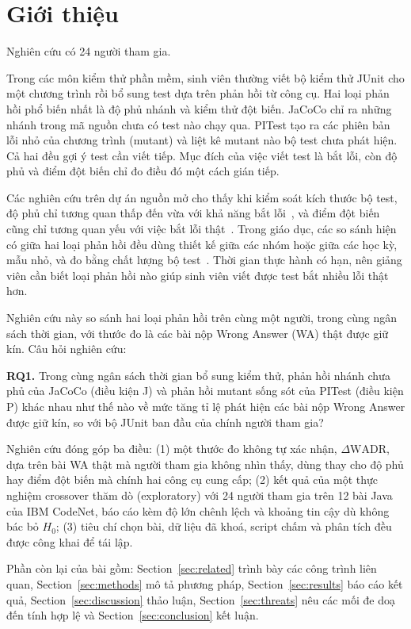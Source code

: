 \section{Giới thiệu}
\label{sec:intro}

Nghiên cứu có 24 người tham gia.

Trong các môn kiểm thử phần mềm, sinh viên thường viết bộ kiểm thử JUnit cho một chương trình rồi bổ sung test dựa trên phản hồi từ công cụ. Hai loại phản hồi phổ biến nhất là độ phủ nhánh và kiểm thử đột biến. JaCoCo chỉ ra những nhánh trong mã nguồn chưa có test nào chạy qua. PITest tạo ra các phiên bản lỗi nhỏ của chương trình (mutant) và liệt kê mutant nào bộ test chưa phát hiện. Cả hai đều gợi ý test cần viết tiếp. Mục đích của việc viết test là bắt lỗi, còn độ phủ và điểm đột biến chỉ đo điều đó một cách gián tiếp.

Các nghiên cứu trên dự án nguồn mở cho thấy khi kiểm soát kích thước bộ test, độ phủ chỉ tương quan thấp đến vừa với khả năng bắt lỗi~\cite{inozemtseva2014}, và điểm đột biến cũng chỉ tương quan yếu với việc bắt lỗi thật~\cite{papadakis2018}. Trong giáo dục, các so sánh hiện có giữa hai loại phản hồi đều dùng thiết kế giữa các nhóm hoặc giữa các học kỳ, mẫu nhỏ, và đo bằng chất lượng bộ test~\cite{mansur2024,alonge2025}. Thời gian thực hành có hạn, nên giảng viên cần biết loại phản hồi nào giúp sinh viên viết được test bắt nhiều lỗi thật hơn.

Nghiên cứu này so sánh hai loại phản hồi trên cùng một người, trong cùng ngân sách thời gian, với thước đo là các bài nộp Wrong Answer (WA) thật được giữ kín. Câu hỏi nghiên cứu:

\textbf{RQ1.} Trong cùng ngân sách thời gian bổ sung kiểm thử, phản hồi nhánh chưa phủ của JaCoCo (điều kiện J) và phản hồi mutant sống sót của PITest (điều kiện P) khác nhau như thế nào về mức tăng tỉ lệ phát hiện các bài nộp Wrong Answer được giữ kín, so với bộ JUnit ban đầu của chính người tham gia?

Nghiên cứu đóng góp ba điều: (1) một thước đo không tự xác nhận, $\Delta\mathrm{WADR}$, dựa trên bài WA thật mà người tham gia không nhìn thấy, dùng thay cho độ phủ hay điểm đột biến mà chính hai công cụ cung cấp; (2) kết quả của một thực nghiệm crossover thăm dò (exploratory) với 24 người tham gia trên 12 bài Java của IBM CodeNet, báo cáo kèm độ lớn chênh lệch và khoảng tin cậy dù không bác bỏ $H_0$; (3) tiêu chí chọn bài, dữ liệu đã khoá, script chấm và phân tích đều được công khai để tái lập.

Phần còn lại của bài gồm: Section~\ref{sec:related} trình bày các công trình liên quan, Section~\ref{sec:methods} mô tả phương pháp, Section~\ref{sec:results} báo cáo kết quả, Section~\ref{sec:discussion} thảo luận, Section~\ref{sec:threats} nêu các mối đe doạ đến tính hợp lệ và Section~\ref{sec:conclusion} kết luận.
